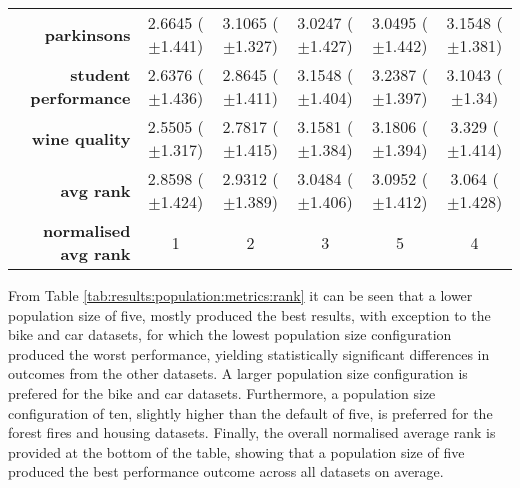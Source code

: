 \begin{table}[htb]
{\begin{tabular}{r|ccccc}
                  \textbf{parkinsons}          & \cellcolor[rgb]{ .388,  .745,  .482}2.6645 ($\pm$1.441) & \cellcolor[rgb]{ .988,  .647,  .467}3.1065 ($\pm$1.327) & \cellcolor[rgb]{ .957,  .91,  .514}3.0247 ($\pm$1.427)  & \cellcolor[rgb]{ 1,  .922,  .518}3.0495 ($\pm$1.442)    & \cellcolor[rgb]{ .973,  .412,  .42}3.1548 ($\pm$1.381)  \\
                  \textbf{student performance} & \cellcolor[rgb]{ .388,  .745,  .482}2.6376 ($\pm$1.436) & \cellcolor[rgb]{ .682,  .827,  .498}2.8645 ($\pm$1.411) & \cellcolor[rgb]{ .992,  .733,  .482}3.1548 ($\pm$1.404) & \cellcolor[rgb]{ .973,  .412,  .42}3.2387 ($\pm$1.397)  & \cellcolor[rgb]{ 1,  .922,  .518}3.1043 ($\pm$1.34)     \\
                  \textbf{wine quality}        & \cellcolor[rgb]{ .388,  .745,  .482}2.5505 ($\pm$1.317) & \cellcolor[rgb]{ .62,  .812,  .494}2.7817 ($\pm$1.415)  & \cellcolor[rgb]{ 1,  .922,  .518}3.1581 ($\pm$1.384)    & \cellcolor[rgb]{ 1,  .855,  .506}3.1806 ($\pm$1.394)    & \cellcolor[rgb]{ .973,  .412,  .42}3.329 ($\pm$1.414)   \\
                  \midrule
                  \textbf{avg rank}            & \cellcolor[rgb]{ .388,  .745,  .482}2.8598 ($\pm$1.424) & \cellcolor[rgb]{ .62,  .812,  .494}2.9312 ($\pm$1.389)  & \cellcolor[rgb]{ 1,  .922,  .518}3.0484 ($\pm$1.406)    & \cellcolor[rgb]{ .973,  .412,  .42}3.0952 ($\pm$1.412)  & \cellcolor[rgb]{ .992,  .753,  .486}3.064 ($\pm$1.428)  \\
                  \midrule
                  \textbf{normalised avg rank} & \cellcolor[rgb]{ .388,  .745,  .482}1                   & \cellcolor[rgb]{ .694,  .831,  .498}2                   & \cellcolor[rgb]{ 1,  .922,  .518}3                      & \cellcolor[rgb]{ .973,  .412,  .42}5                    & \cellcolor[rgb]{ .988,  .667,  .471}4                   \\
            \end{tabular}%

      }
\end{table}%

From Table \ref{tab:results:population:metrics:rank} it can be seen that a lower population size of five, mostly produced the best results, with exception to the bike and car datasets, for which the lowest population size configuration produced the worst performance, yielding statistically significant differences in outcomes from the other datasets. A larger population size configuration is prefered for the bike and car datasets. Furthermore, a population size configuration of ten, slightly higher than the default of five, is preferred for the forest fires and housing datasets. Finally, the overall normalised average rank is provided at the bottom of the table, showing that a population size of five produced the best performance outcome across all datasets on average.

